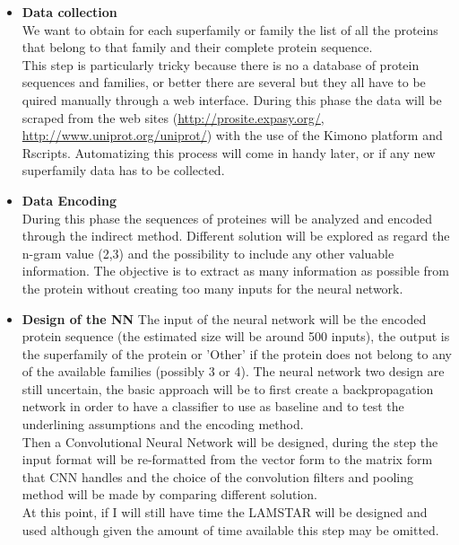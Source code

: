 \documentclass[a4paper, 10pt, conference]{ieeeconf}      %
\begin{document}
\begin{itemize}
	\item \textbf{Data collection}\\
	We want to obtain for each superfamily or family the list of all the proteins that belong to that family and their complete protein sequence.\\
	This step is particularly tricky because there is no a database of protein sequences and families, or better there are several but they all have to be quired manually through a web interface. During this phase the data will be scraped from the web sites (\href{http://prosite.expasy.org/}{http://prosite.expasy.org/}, \href{http://www.uniprot.org/uniprot/}{http://www.uniprot.org/uniprot/}) with the use of the Kimono platform\cite{kimono} and Rscripts. Automatizing this process will come in handy later, or if any new superfamily data has to be collected.
	\item \textbf{Data Encoding}\\
	During this phase the sequences of proteines will be analyzed and encoded through the indirect method. Different solution will be explored as regard the n-gram value (2,3) and the possibility to include any other valuable information. The objective is to extract as many information as possible from the protein without creating too many inputs for the neural network.
	\item \textbf{Design of the NN}
	The input of the neural network will be the encoded protein sequence (the estimated size will be around 500 inputs), the output is the superfamily of the protein or 'Other' if the protein does not belong to any of the available families (possibly 3 or 4).
	The neural network two design are still uncertain, the basic approach will be to first create a backpropagation network in order to have a classifier to use as baseline and to test the underlining assumptions and the encoding method.\\
	Then a Convolutional Neural Network will be designed, during the step the input format will be re-formatted from the vector form to the matrix form that CNN handles and the choice of the convolution filters and pooling method will be made by comparing different solution.\\
	At this point, if I will still have time the LAMSTAR will be designed and used although given the amount of time available this step may be omitted.
\end{itemize}
\end{document}
